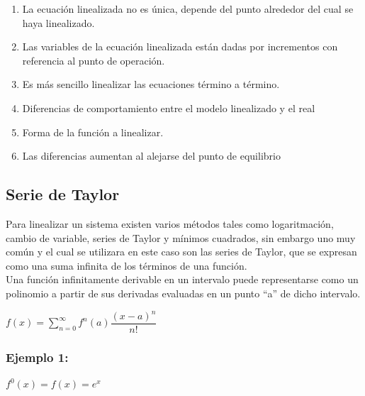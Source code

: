 \documentclass[a4paper,12pt,twoside]{proyectotanquesecci}
\begin{document}
\begin{enumerate}
\item La ecuación linealizada no es única, depende del punto alrededor del cual se haya linealizado.
\item Las variables de la ecuación linealizada están dadas por incrementos con referencia al punto de operación.
\item Es más sencillo linealizar las ecuaciones término a término.
\item Diferencias de comportamiento entre el modelo linealizado y el real
\item Forma de la función a linealizar.
\item Las diferencias aumentan al alejarse del punto de equilibrio 
\end{enumerate}

\subsection{Serie de Taylor}

Para linealizar un sistema existen varios métodos tales como logaritmación, cambio de variable, series de Taylor y mínimos cuadrados, sin embargo uno muy común y el cual se utilizara en este caso son las series de Taylor, que se expresan como una suma infinita de los términos de una función.\\

Una función infinitamente derivable en un intervalo puede representarse como un polinomio a partir de sus derivadas evaluadas en un punto “a” de dicho intervalo.

\begin{center}
	$f\left( x\right) =\sum ^{\infty }_{n=0}f^{n}\left( a\right) \dfrac {\left( x-a\right) ^{n}}{n!}$
\end{center}

\subsubsection{Ejemplo 1:}

\begin{center}
	$f^{0}\left( x\right) =f\left( x\right) =e^{x}$
\end{center}
\end{document}
